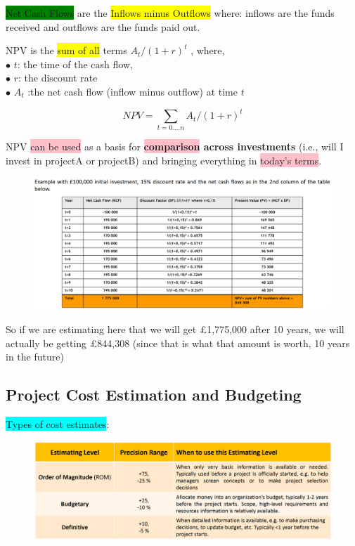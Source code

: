 \documentclass[]{project_plan}
\newcommand{\bulletPoint}{\hspace{-3.1pt}$\bullet$ \hspace{5pt}}
\begin{document}
\colorbox{green}{Net Cash Flows} are the \colorbox{yellow}{Inflows minus Outflows} where: inflows are the funds received and
outflows are the funds paid out.

NPV is the \colorbox{yellow}{sum of all} terms $A_t / (1 + r)^t$ , where,\\
\bulletPoint $t$: the time of the cash flow,\\
\bulletPoint $r$: the discount rate\\
\bulletPoint $A_t$ :the net cash flow (inflow minus outflow) at time $t$

$$NPV = \sum_{t=0....n} A_t / (1 + r)^t$$

NPV \colorbox{pink}{can be used} as a basis for \textbf{\colorbox{pink}{comparison} across investments} (i.e., will I invest in projectA or projectB) and bringing everything in \colorbox{pink}{today's terms}.

\newpage

\begin{figure}[h!]
  \centering
  \includegraphics[width=\linewidth]{npv_example.png}
\end{figure}

So if we are estimating here that we will get £1,775,000 after 10 years,
we will actually be getting £844,308 (since that is what that amount is worth,
10 years in the future)

\subsection{Project Cost Estimation and Budgeting}
\colorbox{cyan}{Types of cost estimates}:
\begin{figure}[h!]
  \centering
  \includegraphics[width=\linewidth]{types_of_cost_estimates.png}
\end{figure}
\end{document}
